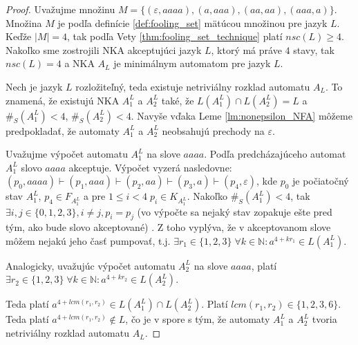\begin{proof}
Uvažujme množinu $ M = \lbrace (\varepsilon,aaaa),(a,aaa),(aa,aa),(aaa,a)\rbrace $. Množina $ M $ je podľa definície \ref{def:fooling_set} mätúcou množinou pre jazyk $ L $. Keďže $ |M| = 4 $, tak podľa Vety \ref{thm:fooling_set_technique} platí $ nsc(L) \geq 4 $. Nakoľko sme zostrojili NKA akceptujúci jazyk $ L $, ktorý má práve $ 4 $ stavy, tak $ nsc(L) = 4 $ a NKA $ A_{L} $ je minimálnym automatom pre jazyk $ L $.
\par
Nech je jazyk $ L$ rozložiteľný, teda existuje netriviálny rozklad automatu $ A_{L} $. To znamená, že existujú NKA $ A_1^{L} $ a $ A_2^{L} $ také, že $ L(A_1^{L}) \cap L(A_2^{L}) = L $ a $ \#_S(A_1^{L}) < 4 $, $ \#_S(A_2^{L}) < 4 $. Navyše vďaka Leme \ref{lm:nonepsilon_NFA} môžeme predpokladať, že automaty $ A_1^{L} $ a $ A_2^{L} $ neobsahujú prechody na $ \varepsilon $. 
\par
Uvažujme výpočet automatu $ A_1^{L} $ na slove $ aaaa $. Podľa predcházajúceho automat $ A_1^{L} $ slovo $ aaaa $ akceptuje. Výpočet vyzerá nasledovne: $ (p_0,aaaa) \vdash (p_1, aaa) \vdash (p_{2}, aa) \vdash (p_3, a) \vdash (p_4, \varepsilon) $, kde $ p_0 $ je počiatočný stav $ A_1^{L} $, $ p_4 \in F_{A_1^{L}} $ a pre $ 1 \leq i < 4 \; p_i \in K_{A_1^{L}}$. Nakoľko $ \#_S(A_1^{L}) < 4 $, tak $ \exists i,j \in \lbrace 0,1,2,3 \rbrace, i \neq j, p_i=p_j $ (vo výpočte sa nejaký stav zopakuje ešte pred tým, ako bude slovo akceptované) . Z toho vyplýva, že v akceptovanom slove môžem nejakú jeho časť pumpovať, t.j. $ \exists r_1 \in \lbrace 1,2,3 \rbrace \; \forall k \in \mathbb{N}: a^{4 + kr_1} \in L(A_1^{L}) $.
\par
Analogicky, uvažujúc výpočet automatu $ A_2^{L} $ na slove $ aaaa $, platí $ \exists r_2 \in \lbrace 1,2,3 \rbrace \; \forall k \in \mathbb{N}: a^{4 + kr_2} \in L(A_2^{L}) $.
\par
Teda platí $ a^{4 + lcm(r_1,r_2)} \in L(A_1^{L}) \cap L(A_2^{L}) $. Platí $ lcm(r_1,r_2) \in \lbrace 1,2,3,6 \rbrace $. Teda platí $ a^{4 + lcm(r_1,r_2)} \notin L $, čo je v spore s tým, že automaty $ A_1^{L} $ a $ A_2^{L} $ tvoria netriviálny rozklad automatu $ A_{L} $.
\end{proof}













